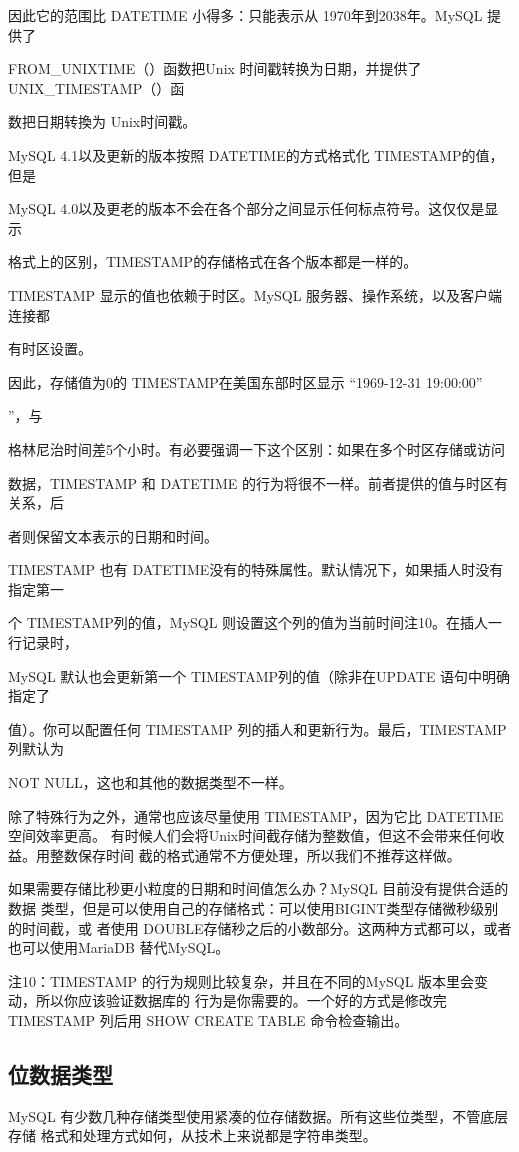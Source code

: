 因此它的范围比 DATETIME 小得多：只能表示从 1970年到2038年。MySQL 提供了

FROM\_UNIXTIME（）函数把Unix 时间戳转换为日期，并提供了 UNIX\_TIMESTAMP（）函

数把日期转換为 Unix时间戳。

MySQL 4.1以及更新的版本按照 DATETIME的方式格式化 TIMESTAMP的值，但是

MySQL 4.0以及更老的版本不会在各个部分之间显示任何标点符号。这仅仅是显示

格式上的区别，TIMESTAMP的存储格式在各个版本都是一样的。

TIMESTAMP 显示的值也依赖于时区。MySQL 服务器、操作系统，以及客户端连接都

有时区设置。

因此，存储值为0的 TIMESTAMP在美国东部时区显示 “1969-12-31 19:00:00”

”，与

格林尼治时间差5个小时。有必要强调一下这个区别：如果在多个时区存储或访问

数据，TIMESTAMP 和 DATETIME 的行为将很不一样。前者提供的值与时区有关系，后

者则保留文本表示的日期和时间。

TIMESTAMP 也有 DATETIME没有的特殊属性。默认情况下，如果插人时没有指定第一

个 TIMESTAMP列的值，MySQL 则设置这个列的值为当前时间注10。在插人一行记录时，

MySQL 默认也会更新第一个 TIMESTAMP列的值（除非在UPDATE 语句中明确指定了

值）。你可以配置任何 TIMESTAMP 列的插人和更新行为。最后，TIMESTAMP列默认为

NOT NULL，这也和其他的数据类型不一样。

除了特殊行为之外，通常也应该尽量使用 TIMESTAMP，因为它比 DATETIME 空间效率更高。
有时候人们会将Unix时间截存储为整数值，但这不会带来任何收益。用整数保存时间
截的格式通常不方便处理，所以我们不推荐这样做。

如果需要存储比秒更小粒度的日期和时间值怎么办？MySQL 目前没有提供合适的数据
类型，但是可以使用自己的存储格式：可以使用BIGINT类型存储微秒级别的时间截，或
者使用 DOUBLE存储秒之后的小数部分。这两种方式都可以，或者也可以使用MariaDB
替代MySQL。

注10：TIMESTAMP 的行为规则比较复杂，并且在不同的MySQL 版本里会变动，所以你应该验证数据库的
行为是你需要的。一个好的方式是修改完 TIMESTAMP 列后用 SHOW CREATE TABLE 命令检查输出。

\subsection{位数据类型}
MySQL 有少数几种存储类型使用紧凑的位存储数据。所有这些位类型，不管底层存储
格式和处理方式如何，从技术上来说都是字符串类型。


